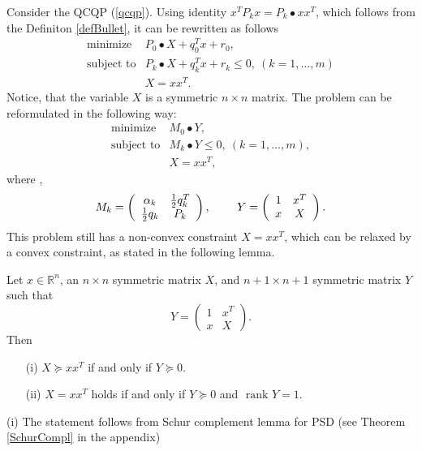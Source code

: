 \documentclass[12pt]{book}
\theoremstyle{definition}
\begin{document}
Consider the QCQP (\ref{qcqp}). Using identity $x^TP_kx = P_k\bullet xx^T$, which follows from the Definiton \ref{defBullet}, it can be rewritten as follows
\begin{equation} 
\label{1stStepToSDPr}
\begin{array}{ll}
\mbox{minimize}& P_0\bullet X + q_0^Tx +r_0, \\
\mbox{subject to}& P_k\bullet X+ q_k^Tx + r_k  \leq 0, \  (k = 1,\dots ,m)\\
& X = xx^T.
\end{array} 
\end{equation}
Notice, that the variable $X$ is a symmetric $n\times n$ matrix. 
 The problem can be reformulated in the following way:
 \begin{equation} 
\label{2ndStepToSDPr}
\begin{array}{ll}
\mbox{minimize}& M_0\bullet Y, \\
\mbox{subject to}& M_k\bullet Y \leq 0, \  (k = 1,\dots ,m),\\
& X = xx^T,
\end{array} 
\end{equation}
 where , 
\begin{equation*}
M_k = \left(
\begin{array}{cc}
\alpha_k & {1\over 2}q_k^T \\
{1\over 2}q_k & P_k
\end{array}\right), 
\ \ \ \ \ \ \
Y =  \left(
\begin{array}{cc}
1 & x^T \\
x & X
\end{array}\right).
\end{equation*}
 This problem still has a non-convex constraint $X = xx^T$, which can be relaxed by a convex constraint, as stated in the following lemma.
  
\lema 
\label{relaxRank1Lemma}
Let $x\in \mathbb{R}^n$, an $n\times n$ symmetric matrix $X$, and $n+1\times n+1$ symmetric matrix $Y$ such that 
$$Y =  \left(
\begin{array}{cc}
1 & x^T \\
x & X
\end{array}\right). 
$$  Then
\begin{itemize}
\item[(i)] $X\succeq xx^T$ if and only if $Y\succeq 0$.
\item[(ii)] $X=xx^T$ holds if and only if $Y\succeq 0$ and \rm $\mbox{ rank } Y=1$. 
\end{itemize}
\proof (i) The statement follows from Schur complement lemma for PSD (see Theorem \ref{SchurCompl} in the appendix) 
\end{document}
